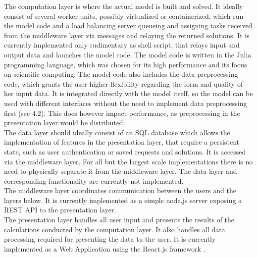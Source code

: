 \documentclass[
	11pt,								%
	DIV10,								%
	a4paper,         					%
	oneside,							%
	headheight=20pt,					%
	footheight=20pt,					%
    parskip=full,						%
    listof=totoc,						%
	bibliography=totoc,					%
	index=totoc,						%
]{scrartcl}
\begin{document}
The computation layer is where the actual model is built and solved. It ideally consist of several worker units, possibly virtualized or containerized, which run the model code and a load balancing server queueing and assigning tasks received from the middleware layer via messages and relaying the returned solutions. It is currently implemented only rudimentary as shell script, that relays input and output data and launches the model code. The model code is written in the Julia programming language, which was chosen for its high performance \cite{JuliaMicroBenchmarks2018} and its focus on scientific computing. The model code also includes the data preprocessing code, which grants the user higher flexibility regarding the form and quality of her input data. It is integrated directly with the model itself, so the model can be used with different interfaces without the need to implement data preprocessing first (see 4.2). This does however impact performance, as preprocessing in the presentation layer would be distributed. \\
The data layer should ideally consist of an SQL database which allows the implementation of features in the presentation layer, that require a persistent state, such as user authentication or saved requests and solutions. It is accessed via the middleware layer. For all but the largest scale implementations there is no need to physically separate it from the middleware layer. The data layer and corresponding functionality are currently not implemented.
\\
The middleware layer coordinates communication between the users and the layers below. It is currently implemented as a simple node.js server \cite{fieldingArchitecturalStylesDesign2000} exposing a REST API \cite{fieldingArchitecturalStylesDesign2000} to the presentation layer.
\\
The presentation layer handles all user input and presents the results of the calculations conducted by the computation layer. It also handles all data processing required for presenting the data tu the user.  It is currently implemented as a Web Application using the React.js framework \cite{ReactJavaScriptLibrary2019} . 
\end{document}
